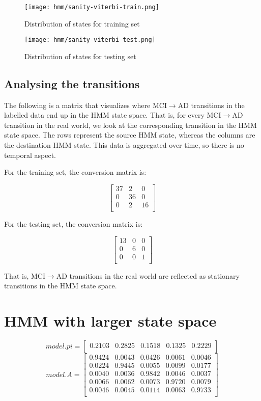 \documentclass[12pt,a4paper]{article}
\begin{document}
\begin{figure}[H]
  \centering
  \texttt{[image: hmm/sanity-viterbi-train.png]}
  \caption{Distribution of states for training set}  
\end{figure}

\begin{figure}[H]
  \texttt{[image: hmm/sanity-viterbi-test.png]}
  \caption{Distribution of states for testing set}  
\end{figure}

\subsection{Analysing the transitions}
\label{sec:an-trans}

The following is a matrix that visualizes where MCI$\rightarrow$AD
transitions in the labelled data end up in the HMM state space. That
is, for every MCI$\rightarrow$AD transition in the real world, we look
at the corresponding transition in the HMM state space. The rows
represent the source HMM state, whereas the columns are the
destination HMM state. This data is aggregated over time, so there is
no temporal aspect. 

For the training set, the conversion matrix is:

\[
\left[ 
\begin{array}{ccc} 
37 & 2 & 0 \\
0  & 36 & 0 \\
0 & 2 & 16 \\
\end{array}
 \right]
\]

For the testing set, the conversion matrix is:

\[
\left[ 
\begin{array}{ccc} 
13 & 0 & 0 \\
0  & 6 & 0 \\
0 & 0 & 1 \\
\end{array}
 \right]
\]

That is, MCI$\rightarrow$AD transitions in the real world are
reflected as stationary transitions in the HMM state space.

\section{HMM with larger state space}

\[
model.pi = \left[ 
\begin{array}{ccccc} 
  0.2103 & 0.2825 & 0.1518 & 0.1325 & 0.2229\\
\end{array}
 \right]
\]
\[
model.A = \left[ 
\begin{array}{ccccc} 
0.9424 & 0.0043 & 0.0426 & 0.0061 & 0.0046 \\
0.0224 & 0.9445 & 0.0055 & 0.0099 & 0.0177 \\
0.0040 & 0.0036 & 0.9842 & 0.0046 & 0.0037 \\
0.0066 & 0.0062 & 0.0073 & 0.9720 & 0.0079 \\
0.0046 & 0.0045 & 0.0114 & 0.0063 & 0.9733 \\
\end{array}
 \right]
\]
\end{document}
